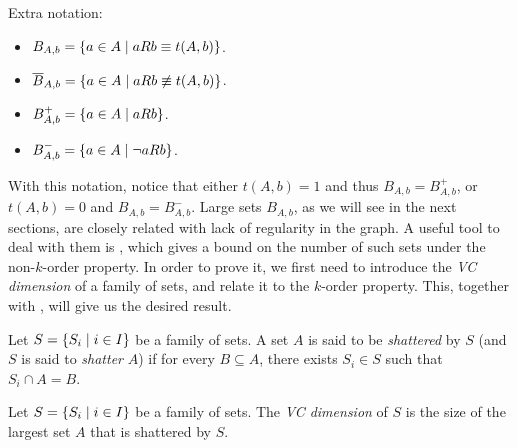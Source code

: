    Extra notation:
    \begin{itemize}
        \item $B_{A,b} = \left\{ a \in A \mid a R b \equiv t(A,b) \right\}$.
        \item $\overline{B}_{A,b} = \left\{ a \in A \mid a R b \not\equiv t(A,b) \right\}$.
        \item $B^+_{A,b} = \left\{ a \in A \mid a R b \right\}$.
        \item $B^-_{A,b} = \left\{ a \in A \mid \neg a R b \right\}$.
    \end{itemize}
    With this notation, notice that either $t(A,b) = 1$ and thus $B_{A,b} = B^+_{A,b}$, or $t(A,b) = 0$ and $B_{A,b} = B^-_{A,b}$.
    Large sets $B_{A,b}$, as we will see in the next sections, are closely related with lack of regularity in the graph.
    A useful tool to deal with them is , which gives a bound on the number of such sets under the
    non-$k$-order property.
    In order to prove it, we first need to introduce the \emph{VC dimension} of a family of sets, and relate it to the
    $k$-order property.
    This, together with , will give us the desired result.

    \begin{definition} \label{def:shattered}
        Let $S = \left\{ S_i \mid i \in I \right\}$ be a family of sets.
        A set $A$ is said to be \emph{shattered} by $S$ (and $S$ is said to \emph{shatter} $A$) if
        for every $B \subseteq A$, there exists $S_i \in S$ such that $S_i \cap A = B$.
    \end{definition}

    \begin{definition} \label{def:VC_dimension}
        Let $S = \left\{ S_i \mid i \in I \right\}$ be a family of sets.
        The \emph{VC dimension} of $S$ is the size of the largest set $A$ that is shattered by $S$.
    \end{definition}


